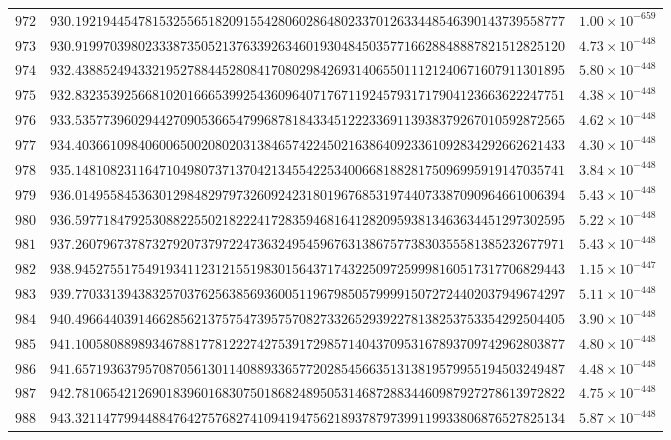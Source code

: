 \documentclass[12pt,reqno]{amsart}
\theoremstyle{remark}
\begin{document}
\begin{longtable}{clc}
$972$ & $930.1921944547815325565182091554280602864802337012633448546390143739558777$ & $1.00\times 10^{-659}$ \\
$973$ & $930.9199703980233387350521376339263460193048450357716628848887821512825120$ & $4.73\times 10^{-448}$ \\
$974$ & $932.4388524943321952788445280841708029842693140655011121240671607911301895$ & $5.80\times 10^{-448}$ \\
$975$ & $932.8323539256681020166653992543609640717671192457931717904123663622247751$ & $4.38\times 10^{-448}$ \\
$976$ & $933.5357739602944270905366547996878184334512223369113938379267010592872565$ & $4.62\times 10^{-448}$ \\
$977$ & $934.4036610984060065002080203138465742245021638640923361092834292662621433$ & $4.30\times 10^{-448}$ \\
$978$ & $935.1481082311647104980737137042134554225340066818828175096995919147035741$ & $3.84\times 10^{-448}$ \\
$979$ & $936.0149558453630129848297973260924231801967685319744073387090964661006394$ & $5.43\times 10^{-448}$ \\
$980$ & $936.5977184792530882255021822241728359468164128209593813463634451297302595$ & $5.22\times 10^{-448}$ \\
$981$ & $937.2607967378732792073797224736324954596763138675773830355581385232677971$ & $5.43\times 10^{-448}$ \\
$982$ & $938.9452755175491934112312155198301564371743225097259998160517317706829443$ & $1.15\times 10^{-447}$ \\
$983$ & $939.7703313943832570376256385693600511967985057999915072724402037949674297$ & $5.11\times 10^{-448}$ \\
$984$ & $940.4966440391466285621375754739575708273326529392278138253753354292504405$ & $3.90\times 10^{-448}$ \\
$985$ & $941.1005808898934678817781222742753917298571404370953167893709742962803877$ & $4.80\times 10^{-448}$ \\
$986$ & $941.6571936379570870561301140889336577202854566351313819579955194503249487$ & $4.48\times 10^{-448}$ \\
$987$ & $942.7810654212690183960168307501868248950531468728834460987927278613972822$ & $4.75\times 10^{-448}$ \\
$988$ & $943.3211477994488476427576827410941947562189378797399119933806876527825134$ & $5.87\times 10^{-448}$ \\

\end{longtable}
\end{document}
